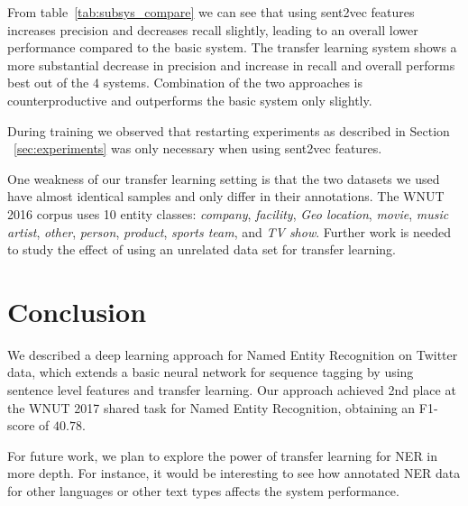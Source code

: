 \documentclass[11pt,letterpaper]{article}
\begin{document}
From table~\ref{tab:subsys_compare} we can see that using sent2vec features
increases precision and decreases recall slightly, leading to an overall lower performance
compared to the basic system.
The transfer learning system shows a more substantial decrease in precision and
increase in recall and overall performs best out of the $4$ systems.
Combination of the two approaches is counterproductive and outperforms the basic
system only slightly.

During training we observed that restarting experiments as described in Section
~\ref{sec:experiments} was only necessary when using sent2vec features.

One weakness of our transfer learning setting is that the two datasets we used have 
almost identical samples and only differ in their annotations. The WNUT 2016 corpus
uses 10 entity classes: \textit{company}, \textit{facility}, \textit{Geo location},
\textit{movie}, \textit{music artist}, \textit{other}, \textit{person}, \textit{product},
\textit{sports team}, and \textit{TV show}. Further work is needed to study the
effect of using an unrelated data set for transfer learning.

\section{Conclusion}

We described a deep learning approach for Named Entity Recognition on Twitter data,
which extends a basic neural network for sequence tagging by using sentence level features
and transfer learning. Our approach achieved 2nd place at the WNUT 2017 shared
task for Named Entity Recognition, obtaining an F1-score of $40.78$.

For future work, we plan to explore the power of transfer learning for NER in more depth.
For instance, it would be interesting to see how annotated NER data for other
languages or other text types affects the system performance.


\end{document}
